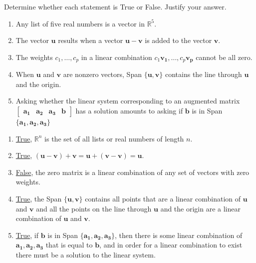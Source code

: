 \documentclass{mathhomework}
\newcommand{\R}{\mathbb{R}}  %
\newcommand{\Vect}[1]{\pmb{#1}}
\begin{document}
\begin{problem}[1.3\#24]
    Determine whether each statement is True or False. Justify your answer.
    \begin{enumerate}[label=(\alph*)]
        \item Any list of five real numbers is a vector in $\R^5$.
        \item The vector $\Vect{u}$ results when a vector $\Vect{u} - \Vect{v}$ is added to the vector $\Vect{v}$.
        \item The weights $c_1,\ldots,c_p$ in a linear combination $c_1\Vect{v_1}, \ldots, c_p\Vect{v_p}$ cannot be all zero.
        \item When $\Vect{u}$ and $\Vect{v}$ are nonzero vectors, Span $\{\Vect{u}, \Vect{v}\}$ contains the line through $\Vect{u}$ and the origin.
        \item Asking whether the linear system corresponding to an augmented matrix $\begin{bmatrix}\Vect{a_1} & \Vect{a_2} & \Vect{a_3} & \Vect{b}\end{bmatrix}$ has a solution amounts to asking if $\Vect{b}$ is in Span $\{\Vect{a_1}, \Vect{a_2}, \Vect{a_3}\}$
    \end{enumerate}

    \begin{solution}
        \begin{enumerate}[label=(\alph*)]
            \item \underline{True}, $\R^n$ is the set of all lists or real numbers of length $n$.
            \item \underline{True}, $(\Vect{u} - \Vect{v}) + \Vect{v} = \Vect{u} + (\Vect{v} - \Vect{v}) = \Vect{u}$. 
            \item \underline{False}, the zero matrix is a linear combination of any set of vectors with zero weights.
            \item \underline{True}, the Span $\{\Vect{u}, \Vect{v}\}$ contains all points that are a linear combination of $\Vect{u}$ and $\Vect{v}$ and all the points on the line through $\Vect{u}$ and the origin are a linear combination of $\Vect{u}$ and $\Vect{v}$.
            \item \underline{True}, if $\Vect{b}$ is in Span $\{\Vect{a_1}, \Vect{a_2}, \Vect{a_3}\}$, then there is some linear combination of $\Vect{a_1}, \Vect{a_2}, \Vect{a_3}$ that is equal to $\Vect{b}$, and in order for a linear combination to exist there must be a solution to the linear system.
        \end{enumerate}
    \end{solution}
\end{problem}
\end{document}

